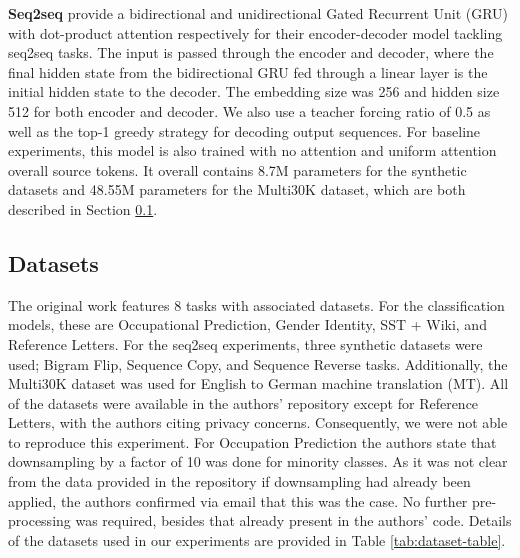 \textbf{Seq2seq} \citet{pruthi-etal-2020-learning} provide a bidirectional and unidirectional Gated Recurrent Unit (GRU) with dot-product attention respectively for their encoder-decoder model tackling seq2seq tasks. The input is passed through the encoder and decoder, where the final hidden state from the bidirectional GRU fed through a linear layer is the initial hidden state to the decoder. The embedding size was 256 and hidden size 512 for both encoder and decoder. We also use a teacher forcing ratio of 0.5 as well as the top-1 greedy strategy for decoding output sequences. For baseline experiments, this model is also trained with no attention and uniform attention overall source tokens. It overall contains 8.7M parameters for the synthetic datasets and 48.55M parameters for the Multi30K dataset, which are both described in Section \ref{sec:datasets}.

\subsection{Datasets}
\label{sec:datasets}

The original work features 8 tasks with associated datasets. For the classification models, these are Occupational Prediction, Gender Identity, SST + Wiki, and Reference Letters. For the seq2seq experiments, three synthetic datasets were used; Bigram Flip, Sequence Copy, and Sequence Reverse tasks. Additionally, the Multi30K dataset \citep{elliott2016multi30k} was used for English to German machine translation (MT). All of the datasets were available in the authors' repository except for Reference Letters, with the authors citing privacy concerns. Consequently, we were not able to reproduce this experiment. For Occupation Prediction the authors state that downsampling by a factor of 10 was done for minority classes. As it was not clear from the data provided in the repository if downsampling had already been applied, the authors confirmed via email that this was the case. No further pre-processing was required, besides that already present in the authors' code. Details of the datasets used in our experiments are provided in Table \ref{tab:dataset-table}.

